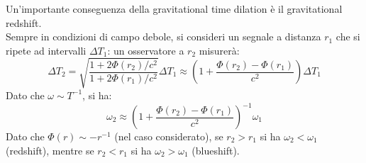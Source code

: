Un'importante conseguenza della gravitational time dilation è il gravitational redshift.\\
Sempre in condizioni di campo debole, si consideri un segnale a distanza $ r_1 $ che si ripete ad intervalli $ \Delta T_1 $: un osservatore a $ r_2 $ misurerà:
\begin{equation}
  \Delta T_2 = \sqrt{\frac{1 + 2\Phi(r_2)/c^2}{1 + 2\Phi(r_1)/c^2}} \Delta T_1 \approx \left( 1 + \frac{\Phi(r_2) - \Phi(r_1)}{c^2} \right) \Delta T_1
  \label{eq:1.42}
\end{equation}
Dato che $ \omega \sim T^{-1} $, si ha:
\begin{equation}
  \omega_2 \approx \left( 1 + \frac{\Phi(r_2) - \Phi(r_1)}{c^2} \right)^{-1} \omega_1
  \label{eq:1.43}
\end{equation}
Dato che $ \Phi(r) \sim -r^{-1} $ (nel caso considerato), se $ r_2 > r_1 $ si ha $ \omega_2 < \omega_1 $ (redshift), mentre se $ r_2 < r_1 $ si ha $ \omega_2 > \omega_1 $ (blueshift).










